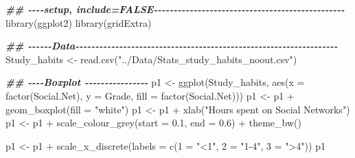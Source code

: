 \documentclass[
]{gitbook}
\newenvironment{Shaded}{\begin{snugshade}}{\end{snugshade}}
\newcommand{\AttributeTok}[1]{\textcolor[rgb]{0.77,0.63,0.00}{#1}}
\newcommand{\DocumentationTok}[1]{\textcolor[rgb]{0.56,0.35,0.01}{\textbf{\textit{#1}}}}
\newcommand{\FloatTok}[1]{\textcolor[rgb]{0.00,0.00,0.81}{#1}}
\newcommand{\FunctionTok}[1]{\textcolor[rgb]{0.00,0.00,0.00}{#1}}
\newcommand{\NormalTok}[1]{#1}
\newcommand{\OtherTok}[1]{\textcolor[rgb]{0.56,0.35,0.01}{#1}}
\newcommand{\SpecialCharTok}[1]{\textcolor[rgb]{0.00,0.00,0.00}{#1}}
\newcommand{\StringTok}[1]{\textcolor[rgb]{0.31,0.60,0.02}{#1}}
\begin{document}
\begin{Shaded}
\begin{Highlighting}[]
\DocumentationTok{\#\# {-}{-}{-}{-}setup, include=FALSE{-}{-}{-}{-}{-}{-}{-}{-}{-}{-}{-}{-}{-}{-}{-}{-}{-}{-}{-}{-}{-}{-}{-}{-}{-}{-}{-}{-}{-}{-}{-}{-}{-}{-}{-}{-}{-}{-}{-}{-}{-}{-}{-}{-}{-}{-}{-}{-}}
\FunctionTok{library}\NormalTok{(ggplot2)}
\FunctionTok{library}\NormalTok{(gridExtra)}

\DocumentationTok{\#\# {-}{-}{-}{-}{-}{-}Data{-}{-}{-}{-}{-}{-}{-}{-}{-}{-}{-}{-}{-}{-}{-}{-}{-}{-}{-}{-}{-}{-}{-}{-}{-}{-}{-}{-}{-}{-}{-}{-}{-}{-}{-}{-}{-}{-}{-}{-}{-}{-}{-}{-}{-}{-}{-}{-}{-}{-}{-}{-}{-}{-}{-}{-}{-}{-}{-}{-}{-}{-}{-}{-}{-}{-}}
\NormalTok{Study\_habits }\OtherTok{\textless{}{-}} \FunctionTok{read.csv}\NormalTok{(}\StringTok{"../Data/Stats\_study\_habits\_noout.csv"}\NormalTok{)}

\DocumentationTok{\#\# {-}{-}{-}{-}Boxplot {-}{-}{-}{-}{-}{-}{-}{-}{-}{-}{-}{-}{-}{-}{-}{-}}
\NormalTok{p1 }\OtherTok{\textless{}{-}} \FunctionTok{ggplot}\NormalTok{(Study\_habits, }\FunctionTok{aes}\NormalTok{(}\AttributeTok{x =} \FunctionTok{factor}\NormalTok{(Social.Net), }\AttributeTok{y =}\NormalTok{ Grade, }\AttributeTok{fill =} \FunctionTok{factor}\NormalTok{(Social.Net)))}
\NormalTok{p1 }\OtherTok{\textless{}{-}}\NormalTok{ p1 }\SpecialCharTok{+} \FunctionTok{geom\_boxplot}\NormalTok{(}\AttributeTok{fill =} \StringTok{"white"}\NormalTok{)}
\NormalTok{p1 }\OtherTok{\textless{}{-}}\NormalTok{ p1 }\SpecialCharTok{+} \FunctionTok{xlab}\NormalTok{(}\StringTok{"Hours spent on Social Networks"}\NormalTok{)}
\NormalTok{p1 }\OtherTok{\textless{}{-}}\NormalTok{ p1 }\SpecialCharTok{+} \FunctionTok{scale\_colour\_grey}\NormalTok{(}\AttributeTok{start =} \FloatTok{0.1}\NormalTok{, }\AttributeTok{end =} \FloatTok{0.6}\NormalTok{) }\SpecialCharTok{+} \FunctionTok{theme\_bw}\NormalTok{()}

\NormalTok{p1 }\OtherTok{\textless{}{-}}\NormalTok{ p1 }\SpecialCharTok{+} \FunctionTok{scale\_x\_discrete}\NormalTok{(}\AttributeTok{labels =} \FunctionTok{c}\NormalTok{(}\StringTok{\textasciigrave{}}\AttributeTok{1}\StringTok{\textasciigrave{}} \OtherTok{=} \StringTok{"\textless{}1"}\NormalTok{, }\StringTok{\textasciigrave{}}\AttributeTok{2}\StringTok{\textasciigrave{}} \OtherTok{=} \StringTok{"1{-}4"}\NormalTok{, }\StringTok{\textasciigrave{}}\AttributeTok{3}\StringTok{\textasciigrave{}} \OtherTok{=} \StringTok{"\textgreater{}4"}\NormalTok{))}
\NormalTok{p1}
\end{Highlighting}
\end{Shaded}
\end{document}
